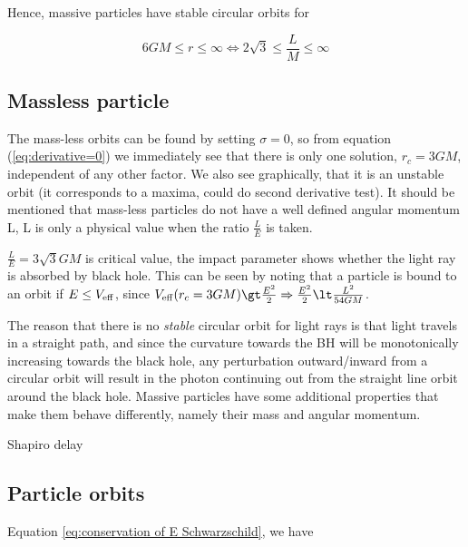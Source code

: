 \documentclass{article}
\begin{document}
Hence, massive particles have stable circular orbits for 

\begin{equation}
    6 G M \leq r \leq \infty \iff 2\sqrt{3} \leq \frac{L}{M} \leq \infty
\end{equation}

\subsection{Massless particle}

The mass-less orbits can be found by setting $\sigma=0$, so from equation (\ref{eq:derivative=0}) we immediately see that there is only one solution, $r_c=3GM$, independent of any other factor. We also see graphically, that it is an unstable orbit (it corresponds to a maxima, could do second derivative test). It should be mentioned that mass-less particles do not have a well defined angular momentum L, L is only a physical value when the ratio $\frac{L}{E}$ is taken. 

$\frac{L}{E} = 3\sqrt{3}GM$ is critical value, the impact parameter shows whether the light ray is absorbed by black hole. This can be seen by noting that a particle is bound to an orbit if $E \leq V_{\rm{eff}}$, since $V_{\rm{eff}}(r_c=3GM) \gt \frac{E^2}{2} \Rightarrow \frac{E^2}{2} \lt \frac{L^2}{54GM}$.

The reason that there is no \textit{stable} circular orbit for light rays is that light travels in a straight path, and since the curvature towards the BH will be monotonically increasing towards the black hole, any perturbation outward/inward from a circular orbit will result in the photon continuing out from the straight line orbit around the black hole. Massive particles have some additional properties that make them behave differently, namely their mass and angular momentum. 


Shapiro delay

\subsection{Particle orbits}

Equation \ref{eq:conservation of E Schwarzschild}, we have
\end{document}
